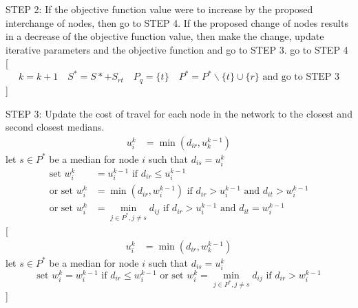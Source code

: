 \documentclass[11pt]{article}
\begin{document}
\begin{algorithm}
\begin{algorithmic}[0]


			\Statex
			\Statex STEP 2: If the objective function value were to increase by the proposed interchange of nodes, then go to STEP 4.  If the proposed change of nodes results in a decrease of the objective function value, then make the change, update iterative parameters and the objective function and go to STEP 3.
			\Statex go to STEP 4
			[
			\begin{equation*}
			k = k+1 \quad  S^*= S* + S_{rt} \quad P_q = \{t\} \quad P^*= P^*\backslash \{t\} \cup \{r\} \text{ and  go to STEP 3}
			\end{equation*}				
			]
			\EndIf


			\Statex
			\Statex STEP 3: Update the cost of travel for each node in the network to the closest and second closest medians.
			\begin{align*}
			u_i^k & = \min(d_{ir},u_k^{k-1})
			\end{align*}
			\Statex let $s \in P^*$ be a median for node $i$ such that $d_{is} = u_i^k$
			\begin{align*}
			\text{set } w_i^k & = u_i^{k-1} \text{ if } d_{ir} \leq u_i^{k-1}\\
			\text{or set } w_i^k & = \min(d_{ir},w_i^{k-1}) \text{ if } d_{ir} > u_i^{k-1} \text{ and } d_{it} > w_i^{k-1}\\
			\text{or set } w_i^k & = \min_{j\in P^*,j\neq s}d_{ij} \text{ if } d_{ir} > u_i^{k-1} \text{ and } d_{it} = w_i^{k-1}
			\end{align*}
			[
			\begin{align*}
			u_i^k & = \min(d_{ir},w_k^{k-1})
			\end{align*}
			\Statex let $s \in P^*$ be a median for node $i$ such that $d_{is} = u_i^k$
			\begin{equation*}
			\text{set } w_i^k  = w_i^{k-1} \text{ if } d_{ir} \leq w_i^{k-1}
			\text{ or set } w_i^k = \min_{j\in P^*,j\neq s}d_{ij} \text{ if }d_{ir} > w_i^{k-1}
			\end{equation*}
			]
			\EndIf			
			
\Statex	
{}
\end{algorithmic}
\end{algorithm}
\end{document}
